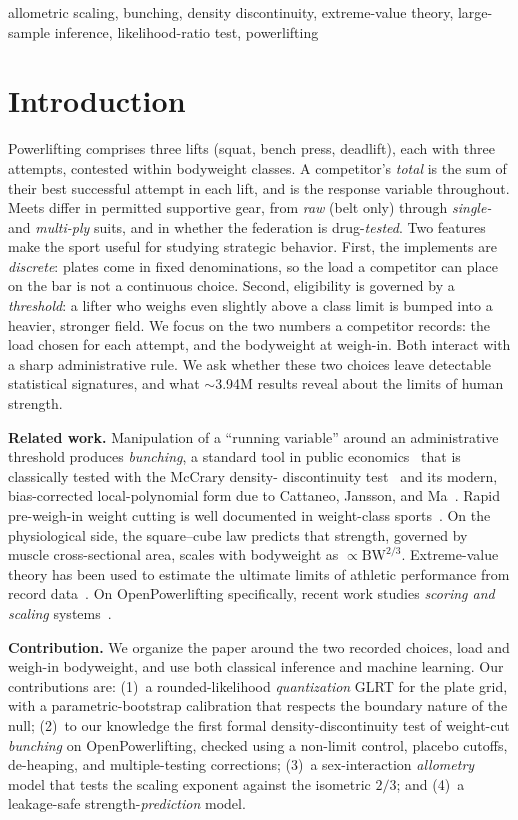 \documentclass[conference]{IEEEtran}
\begin{document}
\begin{IEEEkeywords}
allometric scaling, bunching, density discontinuity, extreme-value theory,
large-sample inference, likelihood-ratio test, powerlifting
\end{IEEEkeywords}

\section{Introduction}
Powerlifting comprises three lifts (squat, bench press, deadlift), each with
three attempts, contested within bodyweight classes. A competitor's
\emph{total} is the sum of their best successful attempt in each lift, and is the
response variable throughout. Meets differ in permitted supportive gear, from
\emph{raw} (belt only) through \emph{single-} and \emph{multi-ply} suits, and in
whether the federation is drug-\emph{tested}. Two features make the sport
useful for studying strategic behavior. First, the implements are
\emph{discrete}: plates come in fixed denominations, so the load a competitor can
place on the bar is not a continuous choice. Second, eligibility is governed by a
\emph{threshold}: a lifter who weighs even slightly above a class limit is bumped
into a heavier, stronger field. We focus on the two numbers a competitor records: the load chosen for each
attempt, and the bodyweight at weigh-in. Both interact with a sharp
administrative rule. We ask whether these
two choices leave detectable statistical signatures, and what $\sim$3.94M results
reveal about the limits of human strength.

\textbf{Related work.} Manipulation of a ``running variable'' around an
administrative threshold produces \emph{bunching}, a standard tool in public
economics~\cite{kleven} that is classically tested with the McCrary density-%
discontinuity test~\cite{mccrary} and its modern, bias-corrected local-polynomial
form due to Cattaneo, Jansson, and Ma~\cite{cjm}. Rapid pre-weigh-in weight cutting
is well documented in weight-class sports~\cite{franchini}. On the physiological side, the
square--cube law predicts that strength, governed by muscle cross-sectional area,
scales with bodyweight as $\propto\text{BW}^{2/3}$. Extreme-value theory has been
used to estimate the ultimate limits of athletic performance from record
data~\cite{einmahl}. On OpenPowerlifting specifically, recent work studies
\emph{scoring and scaling} systems~\cite{peyen}.

\textbf{Contribution.} We organize the paper around the two recorded choices,
load and weigh-in bodyweight, and use both classical
inference and machine learning. Our contributions are: (1)~a rounded-likelihood
\emph{quantization} GLRT for the plate grid, with a parametric-bootstrap
calibration that respects the boundary nature of the null; (2)~to our knowledge the
first formal density-discontinuity test of weight-cut \emph{bunching} on
OpenPowerlifting, checked using a non-limit control, placebo cutoffs, de-heaping,
and multiple-testing corrections; (3)~a sex-interaction \emph{allometry} model that
tests the scaling exponent against the isometric $2/3$; and (4)~a leakage-safe
strength-\emph{prediction} model.
\end{document}
